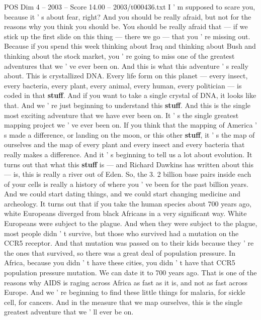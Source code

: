\begin{textsample}{POS Dim 4 – 2003 – Score 14.00 – 2003/t000436.txt}  \label{ex:f4_pos_036}
I ' m supposed to scare you, because it ' s about fear, right?
And you should be really afraid, but not for the reasons why you think you should be.
You should be really afraid that — if we stick up the first slide on this thing — there we go — that you ' re missing out.
Because if you spend this week thinking about Iraq and thinking about Bush and thinking about the stock market, you ' re going to miss one of the greatest adventures that we ' ve ever been on.
And this is what this adventure ' s really about.
This is crystallized DNA.
Every life form on this planet — every insect, every bacteria, every plant, every animal, every human, every politician — is coded in that \textbf{stuff}.
And if you want to take a single crystal of DNA, it looks like that.
And we ' re just beginning to understand this \textbf{stuff}.
And this is the single most exciting adventure that we have ever been on.
It ' s the single greatest mapping project we ' ve ever been on.
If you think that the mapping of America ' s made a difference, or landing on the moon, or this other \textbf{stuff}, it ' s the map of ourselves and the map of every plant and every insect and every bacteria that really makes a difference.
And it ' s beginning to tell us a lot about evolution.
It turns out that what this \textbf{stuff} is — and Richard Dawkins has written about this — is, this is really a river out of Eden.
So, the 3. 2 billion base pairs inside each of your cells is really a history of where you ' ve been for the past billion years.
And we could start dating things, and we could start changing medicine and archeology.
It turns out that if you take the human species about 700 years ago, white Europeans diverged from black Africans in a very significant way.
White Europeans were subject to the plague.
And when they were subject to the plague, most people didn ' t survive, but those who survived had a mutation on the CCR5 receptor.
And that mutation was passed on to their kids because they ' re the ones that survived, so there was a great deal of population pressure.
In Africa, because you didn ' t have these cities, you didn ' t have that CCR5 population pressure mutation.
We can date it to 700 years ago.
That is one of the reasons why AIDS is raging across Africa as fast as it is, and not as fast across Europe.
And we ' re beginning to find these little things for malaria, for sickle cell, for cancers.
And in the measure that we map ourselves, this is the single greatest adventure that we ' ll ever be on.

\end{textsample}
